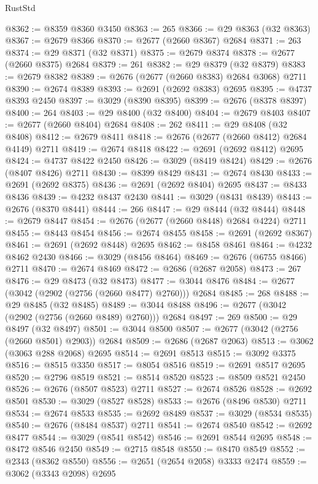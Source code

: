 \begin{lexlean}{RustStd}
\begin{coremodule}
@8362 := @8359 @8360 @3450
@8363 := 265
@8366 := @29 @8363 (@32 @8363)
@8367 := @2679 @8366
@8370 := @2677 (@2660 @8367) @2684
@8371 := 263
@8374 := @29 @8371 (@32 @8371)
@8375 := @2679 @8374
@8378 := @2677 (@2660 @8375) @2684
@8379 := 261
@8382 := @29 @8379 (@32 @8379)
@8383 := @2679 @8382
@8389 := @2676 (@2677 (@2660 @8383) @2684 @3068) @2711
@8390 := @2674 @8389
@8393 := @2691 (@2692 @8383) @2695
@8395 := @4737 @8393 @2450
@8397 := @3029 (@8390 @8395)
@8399 := @2676 (@8378 @8397)
@8400 := 264
@8403 := @29 @8400 (@32 @8400)
@8404 := @2679 @8403
@8407 := @2677 (@2660 @8404) @2684
@8408 := 262
@8411 := @29 @8408 (@32 @8408)
@8412 := @2679 @8411
@8418 := @2676 (@2677 (@2660 @8412) @2684 @4149) @2711
@8419 := @2674 @8418
@8422 := @2691 (@2692 @8412) @2695
@8424 := @4737 @8422 @2450
@8426 := @3029 (@8419 @8424)
@8429 := @2676 (@8407 @8426) @2711
@8430 := @8399 @8429
@8431 := @2674 @8430
@8433 := @2691 (@2692 @8375)
@8436 := @2691 (@2692 @8404) @2695
@8437 := @8433 @8436
@8439 := @4232 @8437 @2430
@8441 := @3029 (@8431 @8439)
@8443 := @2676 (@8370 @8441)
@8444 := 266
@8447 := @29 @8444 (@32 @8444)
@8448 := @2679 @8447
@8454 := @2676 (@2677 (@2660 @8448) @2684 @4224) @2711
@8455 := @8443 @8454
@8456 := @2674 @8455
@8458 := @2691 (@2692 @8367)
@8461 := @2691 (@2692 @8448) @2695
@8462 := @8458 @8461
@8464 := @4232 @8462 @2430
@8466 := @3029 (@8456 @8464)
@8469 := @2676 (@6755 @8466) @2711
@8470 := @2674 @8469
@8472 := @2686 (@2687 @2058)
@8473 := 267
@8476 := @29 @8473 (@32 @8473)
@8477 := @3044 @8476
@8484 := @2677 (@3042 (@2902 (@2756 (@2660 @8477) @2760))) @2684
@8485 := 268
@8488 := @29 @8485 (@32 @8485)
@8489 := @3044 @8488
@8496 := @2677 (@3042 (@2902 (@2756 (@2660 @8489) @2760))) @2684
@8497 := 269
@8500 := @29 @8497 (@32 @8497)
@8501 := @3044 @8500
@8507 := @2677 (@3042 (@2756 (@2660 @8501) @2903)) @2684
@8509 := @2686 (@2687 @2063)
@8513 := @3062 (@3063 @288 @2068) @2695
@8514 := @2691 @8513
@8515 := @3092 @3375
@8516 := @8515 @3350
@8517 := @8054 @8516
@8519 := @2691 @8517 @2695
@8520 := @2796 @8519
@8521 := @8514 @8520
@8523 := @8509 @8521 @2450
@8526 := @2676 (@8507 @8523) @2711
@8527 := @2674 @8526
@8528 := @2692 @8501
@8530 := @3029 (@8527 @8528)
@8533 := @2676 (@8496 @8530) @2711
@8534 := @2674 @8533
@8535 := @2692 @8489
@8537 := @3029 (@8534 @8535)
@8540 := @2676 (@8484 @8537) @2711
@8541 := @2674 @8540
@8542 := @2692 @8477
@8544 := @3029 (@8541 @8542)
@8546 := @2691 @8544 @2695
@8548 := @8472 @8546 @2450
@8549 := @2715 @8548
@8550 := @8470 @8549
@8552 := @2343 (@8362 @8550)
@8556 := @2651 (@2654 @2058) @3333 @2474
@8559 := @3062 (@3343 @2098) @2695

\end{coremodule}
\end{lexlean}
